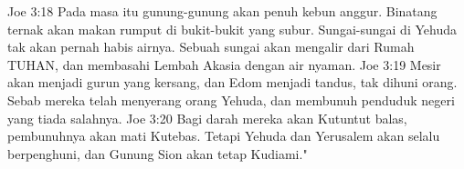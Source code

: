 Joe 3:18  Pada masa itu gunung-gunung akan penuh kebun anggur. Binatang ternak akan makan rumput di bukit-bukit yang subur. Sungai-sungai di Yehuda tak akan pernah habis airnya. Sebuah sungai akan mengalir dari Rumah TUHAN, dan membasahi Lembah Akasia dengan air nyaman.
Joe 3:19  Mesir akan menjadi gurun yang kersang, dan Edom menjadi tandus, tak dihuni orang. Sebab mereka telah menyerang orang Yehuda, dan membunuh penduduk negeri yang tiada salahnya.
Joe 3:20  Bagi darah mereka akan Kutuntut balas, pembunuhnya akan mati Kutebas. Tetapi Yehuda dan Yerusalem akan selalu berpenghuni, dan Gunung Sion akan tetap Kudiami."


